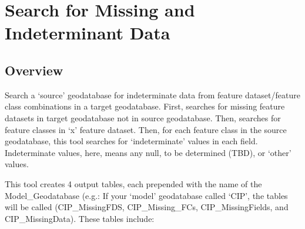 \documentclass[openany]{book}
\theoremstyle{definition}
\theoremstyle{definition}
\theoremstyle{definition}
\theoremstyle{remark}
\begin{document}
\hypertarget{indtSearch}{\chapter{Search for Missing and Indeterminant
Data}\label{indtSearch}}

\section{Overview}\label{overview-7}

Search a `source' geodatabase for indeterminate data from feature
dataset/feature class combinations in a target geodatabase. First,
searches for missing feature datasets in target geodatabase not in
source geodatabase. Then, searches for feature classes in `x' feature
dataset. Then, for each feature class in the source geodatabase, this
tool searches for `indeterminate' values in each field. Indeterminate
values, here, means any null, to be determined (TBD), or `other' values.

This tool creates 4 output tables, each prepended with the name of the
Model\_Geodatabase (e.g.: If your `model' geodatabase called `CIP', the
tables will be called (CIP\_MissingFDS, CIP\_Missing\_FCs,
CIP\_MissingFields, and CIP\_MissingData). These tables include:
\end{document}
